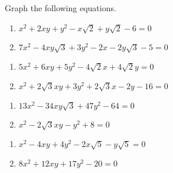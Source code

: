 \documentclass{ximera}
\begin{document}
	\author{Stitz-Zeager}


Graph the following equations.

\begin{multicols}{2}

\begin{enumerate}

\item  $x^2+2xy+y^2 -x\sqrt{2}+y\sqrt{2} -6= 0$

\item  $7x^2-4xy\sqrt{3}+3y^2-2x-2y\sqrt{3}-5= 0$
\setcounter{HW}{\value{enumi}}
\end{enumerate}
\end{multicols}


\begin{multicols}{2}

\begin{enumerate}
\setcounter{enumi}{\value{HW}}

\item  $5x^2+6xy+5y^2 - 4\sqrt{2}x+4\sqrt{2}y = 0$ 
\item  $x^2+ 2\sqrt{3}xy+3y^2+ 2\sqrt{3}x-2y-16 = 0$ 

\setcounter{HW}{\value{enumi}}
\end{enumerate}
\end{multicols}


\begin{multicols}{2}
\begin{enumerate}
\setcounter{enumi}{\value{HW}}



\item  $13x^2-34xy\sqrt{3}+47y^2 - 64=0$
\item  $x^2-2\sqrt{3} xy-y^2+8=0$
\setcounter{HW}{\value{enumi}}
\end{enumerate}
\end{multicols}






\begin{multicols}{2}
\begin{enumerate}
\setcounter{enumi}{\value{HW}}

\item  $x^2-4xy+4y^2-2x\sqrt{5}-y\sqrt{5}=0$

\item  $8x^2+12xy+17y^2 - 20 = 0$
\setcounter{HW}{\value{enumi}}
\end{enumerate}
\end{multicols}
\end{document}
